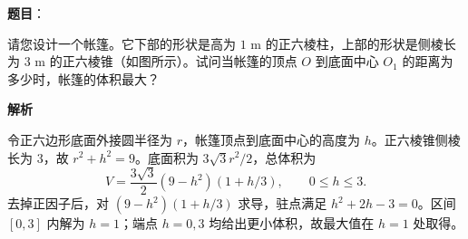 \begin{answer}

\textbf{题目}：

请您设计一个帐篷。它下部的形状是高为 $1\text{ m}$ 的正六棱柱，上部的形状是侧棱长为 $3\text{ m}$ 的正六棱锥（如图所示）。试问当帐篷的顶点 $O$ 到底面中心 $O_1$ 的距离为多少时，帐篷的体积最大？
\nopagebreak[4]
\begin{center}\end{center}
\nopagebreak[4]
\textbf{解析}

令正六边形底面外接圆半径为 $r$，帐篷顶点到底面中心的高度为 $h$。正六棱锥侧棱长为 3，故 $r^2+h^2=9$。底面积为 $3\sqrt3r^2/2$，总体积为
\nopagebreak[4]
\[
V=\frac{3\sqrt3}{2}(9-h^2)(1+h/3),\qquad 0\le h\le3.
\]
去掉正因子后，对 $(9-h^2)(1+h/3)$ 求导，驻点满足 $h^2+2h-3=0$。区间 $[0,3]$ 内解为 $h=1$；端点 $h=0,3$ 均给出更小体积，故最大值在 $h=1$ 处取得。


\end{answer}
